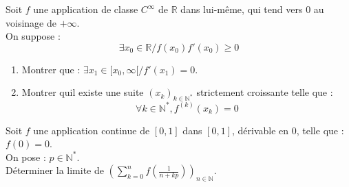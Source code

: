 
\begin{exer}
Soit $f$ une application de classe $C^{\infty}$ de $\mathbb{R}$ dans lui-m\^eme, qui tend vers $0$ au voisinage de $+ \infty$.\\
On suppose :\[\exists x_0 \in \mathbb{R} / f(x_0)f'(x_0) \geqslant 0\]
\begin{enumerate}
\item Montrer que : $\exists x_1 \in [x_0 , \infty[ / f'(x_1) = 0$.
\item Montrer quil existe une suite $(x_k)_{k \in \mathbb{N}^{\ast}}$ strictement croissante telle que :
\[\forall k \in \mathbb{N}^{\ast} , f^{(k)} (x_k) = 0\]
\end{enumerate}
\end{exer}

\begin{exer}%
Soit $f$ une application continue de $[0,1]$ dans $[0,1]$, dérivable en $0$, telle que : $f(0) = 0$.\\
On pose : $p \in \mathbb{N}^*$.\\
Déterminer la limite de $\left(\sum\limits_{k=0}^n f\left(\frac{1}{n+kp}\right)\right)_{n\in\mathbb{N}}$. 
\end{exer}